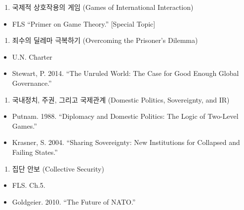 \documentclass[]{book}
\providecommand{\tightlist}{%
  \setlength{\itemsep}{0pt}\setlength{\parskip}{0pt}}
\begin{document}
\begin{enumerate}
\def\labelenumi{\arabic{enumi}.}
\setcounter{enumi}{2}
\tightlist
\item
  국제적 상호작용의 게임 (Games of International Interaction)
\end{enumerate}

\begin{itemize}
\tightlist
\item
  FLS ``Primer on Game Theory.'' {[}Special Topic{]}
\end{itemize}

\begin{enumerate}
\def\labelenumi{\arabic{enumi}.}
\setcounter{enumi}{3}
\tightlist
\item
  죄수의 딜레마 극복하기 (Overcoming the Prisoner's Dilemma)
\end{enumerate}

\begin{itemize}
\tightlist
\item
  U.N. Charter
\item
  Stewart, P. 2014. ``The Unruled World: The Case for Good Enough Global Governance.''
\end{itemize}

\begin{enumerate}
\def\labelenumi{\arabic{enumi}.}
\setcounter{enumi}{4}
\tightlist
\item
  국내정치, 주권, 그리고 국제관계 (Domestic Politics, Sovereignty, and IR)
\end{enumerate}

\begin{itemize}
\tightlist
\item
  Putnam. 1988. ``Diplomacy and Domestic Politics: The Logic of Two-Level Games.''
\item
  Krasner, S. 2004. ``Sharing Sovereignty: New Institutions for Collapsed and Failing States.''
\end{itemize}

\begin{enumerate}
\def\labelenumi{\arabic{enumi}.}
\setcounter{enumi}{5}
\tightlist
\item
  집단 안보 (Collective Security)
\end{enumerate}

\begin{itemize}
\tightlist
\item
  FLS. Ch.5.
\item
  Goldgeier. 2010. ``The Future of NATO.''
\end{itemize}
\end{document}
